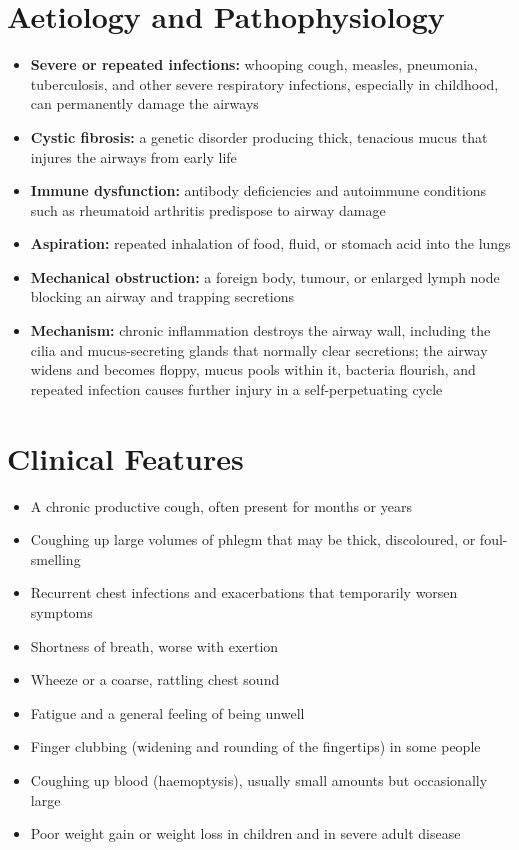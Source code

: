 \section*{Aetiology and Pathophysiology}
\begin{itemize}
    \item \textbf{Severe or repeated infections:} whooping cough, measles, pneumonia, tuberculosis, and other severe respiratory infections, especially in childhood, can permanently damage the airways
    \item \textbf{Cystic fibrosis:} a genetic disorder producing thick, tenacious mucus that injures the airways from early life
    \item \textbf{Immune dysfunction:} antibody deficiencies and autoimmune conditions such as rheumatoid arthritis predispose to airway damage
    \item \textbf{Aspiration:} repeated inhalation of food, fluid, or stomach acid into the lungs
    \item \textbf{Mechanical obstruction:} a foreign body, tumour, or enlarged lymph node blocking an airway and trapping secretions
    \item \textbf{Mechanism:} chronic inflammation destroys the airway wall, including the cilia and mucus-secreting glands that normally clear secretions; the airway widens and becomes floppy, mucus pools within it, bacteria flourish, and repeated infection causes further injury in a self-perpetuating cycle
\end{itemize}

\section*{Clinical Features}
\begin{itemize}
    \item A chronic productive cough, often present for months or years
    \item Coughing up large volumes of phlegm that may be thick, discoloured, or foul-smelling
    \item Recurrent chest infections and exacerbations that temporarily worsen symptoms
    \item Shortness of breath, worse with exertion
    \item Wheeze or a coarse, rattling chest sound
    \item Fatigue and a general feeling of being unwell
    \item Finger clubbing (widening and rounding of the fingertips) in some people
    \item Coughing up blood (haemoptysis), usually small amounts but occasionally large
    \item Poor weight gain or weight loss in children and in severe adult disease
\end{itemize}

